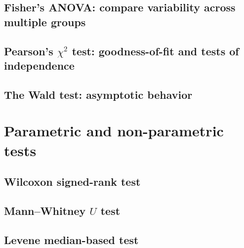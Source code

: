 \subsection{Fisher’s ANOVA: compare variability across multiple groups}

\subsection{Pearson’s \(\chi^{2}\) test: goodness-of-fit and tests of independence}

\subsection{The Wald test: asymptotic behavior}

\section{Parametric and non-parametric tests}

\subsection{Wilcoxon signed-rank test}

\subsection{Mann--Whitney \(U\) test}

\subsection{Levene median-based test}

